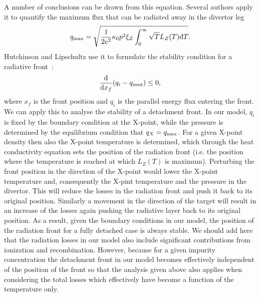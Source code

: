 \documentclass[amsmath,amssymb,a4]{revtex4-2}
\begin{document}
{A number of conclusions can be drawn from this equation. Several authors apply it to quantify the maximum flux that can be radiated away in the divertor leg \cite{lengyel1981,lackner1993,kallenbach2013,siccinio2016}
\begin{equation}\label{maximum_radiated_flux}
    q_{\rm max} = \sqrt{{1\over2 e^2} \kappa_0 p^2 \xi_Z \int_0^\infty \sqrt{T} L_Z(T) {\rm d}T}.
\end{equation}
Hutchinson and Lipschultz use it to formulate the stability condition for a radiative front~\cite{hutchinson1994,lipschultz2016}:
\begin{equation}
    {{\rm d} \over {\rm d}x_f} (q_i - q_{\rm max}) \le 0,
\end{equation}
where $x_f$ is the front position and $q_i$ is the parallel energy flux entering the front. We can apply this to analyse the stability of a detachment front. In our model, $q_i$ is fixed by the boundary condition at the X-point, while the pressure is determined by the equilibrium condition that $q_X = q_{\rm max}$. For a given X-point density then also the X-point temperature is determined, which through the heat conductivity equation sets the position of the radiation front (i.e. the position where the temperature is reached at which $L_Z(T)$ is maximum). Perturbing the front position in the direction of the X-point would lower the X-point temperature and, consequently the X-pint temperature and the pressure in the divertor. This will reduce the losses in the radiation front and push it back to its original position. Similarly a movement in the direction of the target will result in an increase of the losses again pushing the radiative layer back to its original position. As a result, given the boundary conditions in our model, the position of the radiation front for a fully detached case is always stable. We should add here that the radiation losses in our model also include significant contributions from ionization and recombination. However, because for a given impurity concentration the detachment front in our model becomes effectively independent of the position of the front so that the analysis given above also applies when considering the total losses which effectively have become a function of the temperature only.

}
\end{document}
